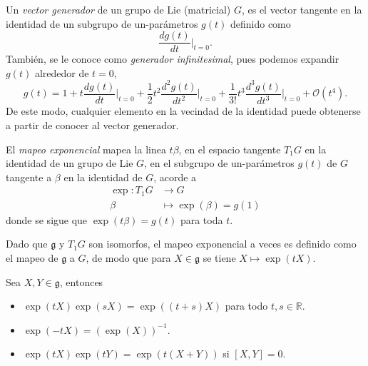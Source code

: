 \begin{mydef}
Un \emph{vector generador} de un grupo de Lie (matricial) $G$, es el vector tangente en la identidad de un subgrupo de un-par\'{a}metros $g (t)$ definido como
%
\begin{equation}
\frac{d g (t)}{dt} \bigg\vert_{t=0}.
\end{equation}
%
Tambi\'{e}n, se le conoce como \emph{generador infinitesimal}, pues podemos expandir $g (t)$ alrededor de $t=0$, $$g (t) = 1 + t \frac{d g (t)}{dt} \bigg\vert_{t=0} + \frac{1}{2}  t^{2} \frac{d^{2} g (t)}{dt^{2}} \bigg\vert_{t=0} + \frac{1}{3 !} t^{3} \frac{d^{3} g (t)}{dt^{3}} \bigg\vert_{t=0} + \mathcal{O} (t^{4}).$$ De este modo, cualquier elemento en la vecindad de la identidad puede obtenerse a partir de conocer al vector generador.
\end{mydef}

\begin{mydef}
El \emph{mapeo exponencial} mapea la linea $t \beta$, en el espacio tangente $T_{1} G$ en la identidad de un grupo de Lie $G$, en el subgrupo de un-par\'{a}metros $g (t)$ de $G$ tangente a $\beta$ en la identidad de $G$, acorde a
%
\begin{align*}
\exp: T_{1} G & \longrightarrow G \\
\beta & \longmapsto \exp (\beta) = g (1)
\end{align*}
%
donde se sigue que $\exp (t \beta) = g (t)$ para toda $t$.
\end{mydef}

\begin{obs}
Dado que $\mathfrak{g}$ y $T_{1} G$ son isomorfos, el mapeo exponencial a veces es definido como el mapeo de $\mathfrak{g}$ a $G$, de modo que para $X \in \mathfrak{g}$ se tiene $X \mapsto \exp(tX)$.
\end{obs}

\begin{pro}
\label{pro:ExpConmutative}
Sea $X, Y \in \mathfrak{g}$, entonces
%
\begin{itemize}
\item{$\exp (t X) \exp (s X) = \exp ((t + s) X)$ para todo $t, s \in \mathbb{R}$.}
\item{$\exp (-t X) = (\exp (X))^{-1}$.}
\item{$\exp (t X) \exp (t Y) = \exp (t (X + Y))$ si $[X, Y] = 0$.}
\end{itemize}
%
\end{pro}

